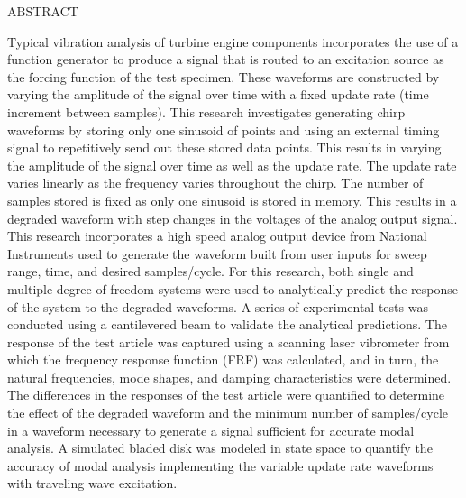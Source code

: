 \newpage
\setcounter{page}{3}
\vspace{2in}
%
\begin{singlespace}
\begin{center}
  ABSTRACT
\end{center}
%
\end{singlespace}
\vspace*{.5in}
%
Typical vibration analysis of turbine engine components incorporates the use of a function generator to produce a signal that is routed to an excitation source as the forcing function of the test specimen.  These waveforms are constructed by varying the amplitude of the signal over time with a fixed update rate (time increment between samples).  This research investigates generating chirp waveforms by storing only one sinusoid of points and using an external timing signal to repetitively send out these stored data points.  This results in varying the amplitude of the signal over time as well as the update rate.  The update rate varies linearly as the frequency varies throughout the chirp.  The number of samples stored is fixed as only one sinusoid is stored in memory.  This results in a degraded waveform with step changes in the voltages of the analog output signal.  This research incorporates a high speed analog output device from National Instruments used to generate the waveform built from user inputs for sweep range, time, and desired samples/cycle.  For this research, both single and multiple degree of freedom systems were used to analytically predict the response of the system to the degraded waveforms.  A series of experimental tests was conducted using a cantilevered beam to validate the analytical predictions.  The response of the test article was captured using a scanning laser vibrometer from which the frequency response function (FRF) was calculated, and in turn, the natural frequencies, mode shapes, and damping characteristics were determined.  The differences in the responses of the test article were quantified to determine the effect of the degraded waveform and the minimum number of samples/cycle in a waveform necessary to generate a signal sufficient for accurate modal analysis.  A simulated bladed disk was modeled in state space to quantify the accuracy of modal analysis implementing the variable update rate waveforms with traveling wave excitation.
